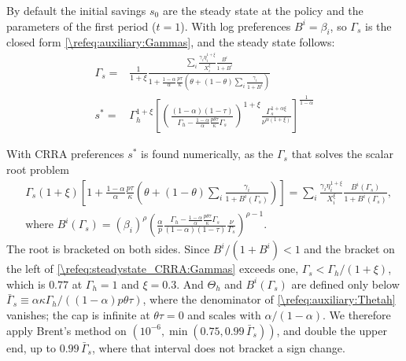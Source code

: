 By default the initial savings $s_0$ are the steady state at the policy and the parameters of the first period ($t=1$). With log preferences $B^i = \beta_i$, so $\Gamma_s$ is the closed form \eqref{\refeq:auxiliary:Gammas}, and the steady state follows:
\begin{subequations}\label{\refeq:steadystate_LOG}
    \begin{align}
        \Gamma_s =& \frac{1}{1+\xi}\frac{\sum_i \frac{\gamma_{i}\eta_{i}^{1+\xi}}{X_{i}^{\xi}}\frac{B^i}{1+B^i}}{1+\frac{1-\alpha}{\alpha}\frac{p\tau}{\kappa}\left(\theta+(1-\theta)\sum_i\frac{\gamma_{i}}{1+B^i}\right)} \label{\refeq:steadystate_LOG:Gammas}\\
         s^* =& \Gamma_h^{1+\xi}\left[\left(\frac{(1-\alpha)(1-\tau)}{\Gamma_h-\frac{1-\alpha}{\alpha}\frac{p\theta\tau}{\kappa}\Gamma_s}\right)^{1+\xi}\frac{\Gamma_s^{1+\alpha\xi}}{\nu^{\alpha(1+\xi)}}\right]^{\frac{1}{1-\alpha}} \label{\refeq:steadystate_LOG:s}
    \end{align}
\end{subequations}

With CRRA preferences $s^*$ is found numerically, as the $\Gamma_s$ that solves the scalar root problem
\begin{subequations}\label{\refeq:steadystate_CRRA}
\begin{align}
    &\Gamma_s(1+\xi)\left[1+\frac{1-\alpha}{\alpha}\frac{p\tau}{\kappa}\left(\theta+(1-\theta)\sum_i\frac{\gamma_i}{1+B^i(\Gamma_s)}\right)\right] = \sum_i\frac{\gamma_i\eta_i^{1+\xi}}{X_i^{\xi}} \frac{B^i(\Gamma_s)}{1+B^i(\Gamma_s)}, \label{\refeq:steadystate_CRRA:Gammas} \\
    &\text{where }B^i(\Gamma_s) = \left(\beta_i\right)^{\rho} \left(\frac{\alpha}{p}\frac{\Gamma_h-\frac{1-\alpha}{\alpha}\frac{p\theta\tau}{\kappa}\Gamma_s}{(1-\alpha)(1-\tau)}\frac{\nu}{\Gamma_s}   \right)^{\rho-1}. \label{\refeq:steadystate_CRRA:Bi}
\end{align}
\end{subequations}
The root is bracketed on both sides. Since $B^i/(1+B^i)<1$ and the bracket on the left of \eqref{\refeq:steadystate_CRRA:Gammas} exceeds one, $\Gamma_s<\Gamma_h/(1+\xi)$, which is $0.77$ at $\Gamma_h = 1$ and $\xi = 0.3$. And $\Theta_{h}$ and $B^i(\Gamma_s)$ are defined only below $\bar{\Gamma}_s\equiv\alpha\kappa\Gamma_h/\left((1-\alpha)p\theta\tau\right)$, where the denominator of \eqref{\refeq:auxiliary:Thetah} vanishes; the cap is infinite at $\theta\tau = 0$ and scales with $\alpha/(1-\alpha)$. We therefore apply Brent's method on $\left(10^{-6}, \min(0.75, 0.99\,\bar{\Gamma}_s)\right)$, and double the upper end, up to $0.99\,\bar{\Gamma}_s$, where that interval does not bracket a sign change.
